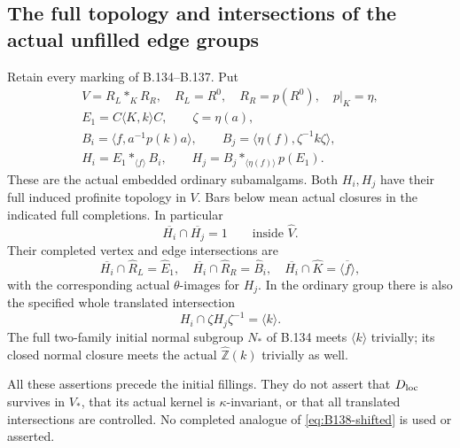\subsection*{The full topology and intersections of the actual unfilled edge groups}

\label{stmt:B138}
Retain every marking of B.134--B.137. Put
\begin{equation}\label{eq:B138-data}
\begin{gathered}
V=R_L*_{K}R_R,\quad R_L=R^0,\quad R_R=p(R^0),\quad p|_K=\eta,\\
E_1=C\langle K,k\rangle C,\qquad \zeta=\eta(a),\\
B_i=\langle f,a^{-1}p(k)a\rangle,\qquad
B_j=\langle\eta(f),\zeta^{-1}k\zeta\rangle,\\
H_i=E_1*_{\langle f\rangle}B_i,\qquad
H_j=B_j*_{\langle\eta(f)\rangle}p(E_1).
\end{gathered}
\end{equation}
These are the actual embedded ordinary subamalgams. Both $H_i,H_j$
have their full induced profinite topology in $V$. Bars below mean
actual closures in the indicated full completions. In particular
\begin{equation}\label{eq:B138-whole-compact}
\overline{H_i}\cap\overline{H_j}=1
\qquad\text{inside }\widehat V.
\end{equation}
Their completed vertex and edge intersections are
\begin{equation}\label{eq:B138-compact-vertices}
\overline{H_i}\cap\widehat R_L=\widehat E_1,\quad
\overline{H_i}\cap\widehat R_R=\widehat B_i,\quad
\overline{H_i}\cap\widehat K=\overline{\langle f\rangle},
\end{equation}
with the corresponding actual $\theta$-images for $H_j$.
In the ordinary group there is also the specified whole translated
intersection
\begin{equation}\label{eq:B138-shifted}
H_i\cap\zeta H_j\zeta^{-1}=\langle k\rangle.
\end{equation}
The full two-family initial normal subgroup $N_*$ of B.134 meets
$\langle k\rangle$ trivially; its closed normal closure meets the
actual $\widehat{\mathbb Z}(k)$ trivially as well.

All these assertions precede the initial fillings. They do not assert
that $D_{\rm loc}$ survives in $V_*$, that its actual kernel is
$\kappa$-invariant, or that all translated intersections are controlled.
No completed analogue of \eqref{eq:B138-shifted} is used or asserted.


